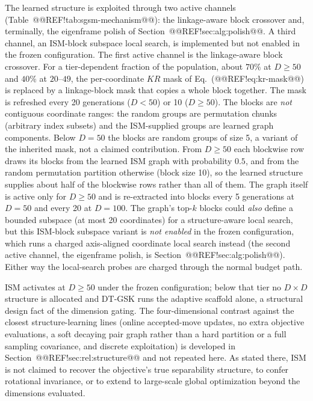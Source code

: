 \documentclass[10pt,a4paper]{article}
\newcommand{\dtgsk}{DT-GSK}
\begin{document}
The learned structure is exploited through two active channels
(Table~@@REF!tab:sgsm-mechanism@@): the linkage-aware block crossover and,
terminally, the eigenframe polish of Section~@@REF!sec:alg:polish@@. A third
channel, an ISM-block subspace local search, is implemented but not
enabled in the frozen configuration.
The first active channel is the linkage-aware block crossover. For a
tier-dependent fraction of the population, about $70\%$ at $D\ge50$ and
$40\%$ at $20$--$49$, the per-coordinate $KR$ mask of
Eq.~(@@REF!eq:kr-mask@@) is replaced by a linkage-block mask that copies a
whole block together. The mask is
refreshed every 20 generations ($D{<}50$) or 10 ($D\ge50$). 
The blocks are \emph{not} contiguous coordinate ranges: the random groups
are permutation chunks (arbitrary index subsets) and the ISM-supplied groups
are learned graph components.
Below $D=50$ the blocks are random groups of size 5, a
variant of the inherited mask, not a claimed contribution. From
$D\ge50$ each blockwise row draws its blocks from the learned ISM graph
with probability $0.5$, and from the random permutation partition
otherwise (block size 10), so the learned structure supplies about half
of the blockwise rows rather than all of them.
The graph itself is active only for $D\ge50$ and is re-extracted into
blocks every 5 generations at $D=50$ and every 20 at $D=100$. 
The graph's top-$k$ blocks could \emph{also} define a bounded subspace (at
most 20 coordinates) for a structure-aware local search, but this ISM-block
subspace variant is \emph{not enabled} in the frozen configuration, which
runs a charged axis-aligned coordinate local search instead (the second
active channel, the eigenframe polish, is Section~@@REF!sec:alg:polish@@). Either
way the local-search probes are charged through the normal budget path. 

ISM activates at $D\ge50$ under the frozen configuration; below that
tier no $D\times D$ structure is allocated and \dtgsk{} runs the
adaptive scaffold alone, a structural design fact of the
dimension gating. 
The four-dimensional contrast against the closest structure-learning
lines (online accepted-move updates, no extra objective evaluations,
a soft decaying pair graph rather than a hard partition or a full
sampling covariance, and discrete exploitation) is developed in
Section~@@REF!sec:rel:structure@@ and not repeated here.
As stated there, ISM is not claimed to recover the objective's true
separability structure, to confer rotational invariance, or to extend
to large-scale global optimization beyond the dimensions evaluated.
\end{document}
